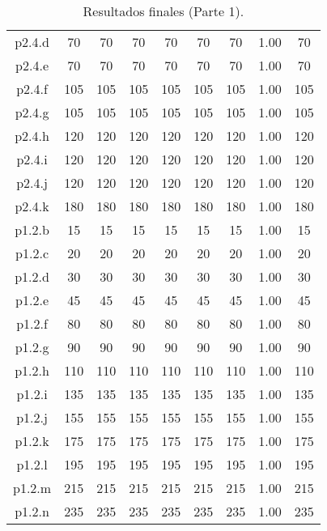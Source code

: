 \begin{table}
\begin{center}
\begin{tabular}{ |c|c|c|c|c|c|c|c|c| }
p2.4.d & 70 & 70 & 70 & 70 & 70 & 70 & 1.00 & 70 \\
p2.4.e & 70 & 70 & 70 & 70 & 70 & 70 & 1.00 & 70 \\
p2.4.f & 105 & 105 & 105 & 105 & 105 & 105 & 1.00 & 105 \\
p2.4.g & 105 & 105 & 105 & 105 & 105 & 105 & 1.00 & 105 \\
p2.4.h & 120 & 120 & 120 & 120 & 120 & 120 & 1.00 & 120 \\
p2.4.i & 120 & 120 & 120 & 120 & 120 & 120 & 1.00 & 120 \\
p2.4.j & 120 & 120 & 120 & 120 & 120 & 120 & 1.00 & 120 \\
p2.4.k & 180 & 180 & 180 & 180 & 180 & 180 & 1.00 & 180 \\
p1.2.b & 15 & 15 & 15 & 15 & 15 & 15 & 1.00 & 15 \\
p1.2.c & 20 & 20 & 20 & 20 & 20 & 20 & 1.00 & 20 \\
p1.2.d & 30 & 30 & 30 & 30 & 30 & 30 & 1.00 & 30 \\
p1.2.e & 45 & 45 & 45 & 45 & 45 & 45 & 1.00 & 45 \\
p1.2.f & 80 & 80 & 80 & 80 & 80 & 80 & 1.00 & 80 \\
p1.2.g & 90 & 90 & 90 & 90 & 90 & 90 & 1.00 & 90 \\
p1.2.h & 110 & 110 & 110 & 110 & 110 & 110 & 1.00 & 110 \\
p1.2.i & 135 & 135 & 135 & 135 & 135 & 135 & 1.00 & 135 \\
p1.2.j & 155 & 155 & 155 & 155 & 155 & 155 & 1.00 & 155 \\
p1.2.k & 175 & 175 & 175 & 175 & 175 & 175 & 1.00 & 175 \\
p1.2.l & 195 & 195 & 195 & 195 & 195 & 195 & 1.00 & 195 \\
p1.2.m & 215 & 215 & 215 & 215 & 215 & 215 & 1.00 & 215 \\
p1.2.n & 235 & 235 & 235 & 235 & 235 & 235 & 1.00 & 235 \\
\hline
\end{tabular}
\end{center}
\caption{Resultados finales (Parte 1).}
\label{tab:resultadosFinales1}
\end{table}


